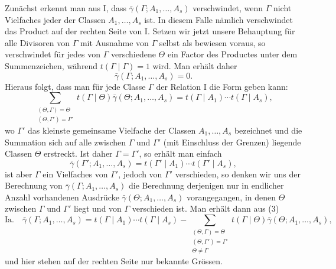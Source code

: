 Zunächst erkennt man aus I, dass $\bar\gamma(\Gamma;A_1,\ldots,A_s)$ verschwindet, wenn $\Gamma$ nicht Vielfaches jeder der Classen $A_1,\ldots,A_s$ ist. In diesem Falle nämlich verschwindet das Product auf der rechten Seite von I. Setzen wir jetzt unsere Behauptung für alle Divisoren von $\Gamma$ mit Ausnahme von $\Gamma$ selbst als bewiesen voraus, so verschwindet für jedes von $\Gamma$ verschiedene $\Theta$ ein Factor des Productes unter dem Summenzeichen, während $t(\Gamma\mid\Gamma)=1$ wird. Man erhält daher
\[
 \bar\gamma(\Gamma;A_1,\ldots,A_s)=0.
\]
Hieraus folgt, dass man für jede Classe $\Gamma$ der Relation I die Form geben kann:
\begin{equation}
 \sum_{\substack{(\Theta,\Gamma)=\Theta\\(\Theta,\Gamma')=\Gamma'}}
 t(\Gamma\mid\Theta)\bar\gamma(\Theta;A_1,\ldots,A_s)
 =t(\Gamma\mid A_1)\cdots t(\Gamma\mid A_s),
\tag{3}
\end{equation}
wo $\Gamma'$ das kleinste gemeinsame Vielfache der Classen $A_1,\ldots,A_s$ bezeichnet und die Summation sich auf alle zwischen $\Gamma$ und $\Gamma'$ (mit Einschluss der Grenzen) liegende Classen $\Theta$ erstreckt. Ist daher $\Gamma=\Gamma'$, so erhält man einfach
\[
 \bar\gamma(\Gamma';A_1,\ldots,A_s)=t(\Gamma'\mid A_1)\cdots t(\Gamma'\mid A_s),
\]
ist aber $\Gamma$ ein Vielfaches von $\Gamma'$, jedoch von $\Gamma'$ verschieden, so denken wir uns der Berechnung von $\bar\gamma(\Gamma;A_1,\ldots,A_s)$ die Berechnung derjenigen nur in endlicher Anzahl vorhandenen Ausdrücke $\bar\gamma(\Theta;A_1,\ldots,A_s)$ vorangegangen, in denen $\Theta$ zwischen $\Gamma$ und $\Gamma'$ liegt und von $\Gamma$ verschieden ist. Man erhält dann aus (3)
\[
\text{Ia.}\quad
 \bar\gamma(\Gamma;A_1,\ldots,A_s)
 =t(\Gamma\mid A_1)\cdots t(\Gamma\mid A_s)
 -\sum_{\substack{(\Theta,\Gamma)=\Theta\\(\Theta,\Gamma')=\Gamma'\\\Theta\ne\Gamma}}
 t(\Gamma\mid\Theta)\bar\gamma(\Theta;A_1,\ldots,A_s),
\]
und hier stehen auf der rechten Seite nur bekannte Grössen.

